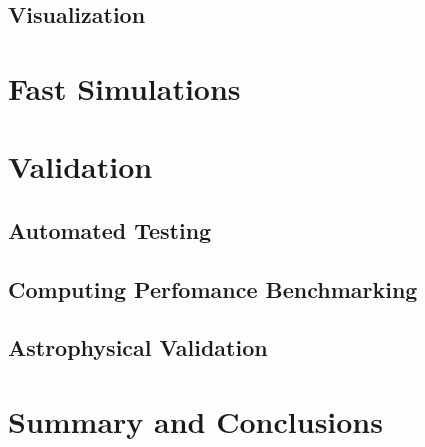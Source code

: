 \documentclass[12pt]{article}
\begin{document}
\subsection{Visualization}

\section{Fast Simulations}

\section{Validation}
\subsection{Automated Testing}
\subsection{Computing Perfomance Benchmarking}
\subsection{Astrophysical Validation}


\section{Summary and Conclusions}
\end{document}
